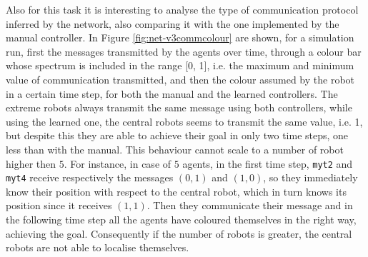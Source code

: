 Also for this task it is interesting to analyse the type of communication protocol 
inferred by the network, also comparing it with the one implemented by the 
manual controller. 
In Figure \ref{fig:net-v3commcolour} are shown, for a simulation run, first the 
messages transmitted by the agents over time, through a colour bar whose 
spectrum is included in the range [0, 1], i.e. the maximum and minimum value of 
communication transmitted, and then the colour assumed by the robot in a 
certain time step, for both the manual and the learned controllers.
The extreme robots always transmit the same message using both controllers, 
while using the learned one, the central robots seems to transmit the same value, 
i.e. 1, but despite this they are able to achieve their goal in only two time steps, 
one less than with the manual. This behaviour cannot scale to a number of robot 
higher then $5$. For instance, in case of $5$ agents, in the first time step, 
\texttt{myt2} and \texttt{myt4} receive respectively the messages $(0, 1)$ and $(1, 
0)$, so they immediately know their position with respect to the central robot, 
which in turn knows its position since it receives $(1, 1)$. Then they communicate 
their message and in the following time step all the agents have coloured 
themselves in the right way, achieving the goal.
Consequently if the number of robots is greater, the central robots are not able to 
localise themselves. 
